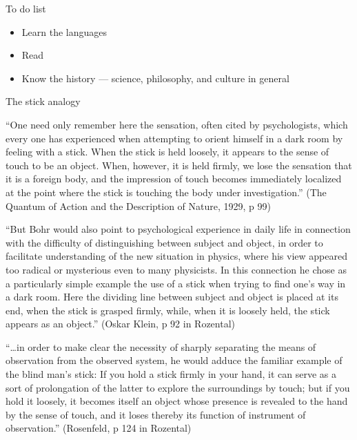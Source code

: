 \documentclass[ignorenonframetext, ]{beamer}
\begin{document}
\begin{frame}{To do list}

  \begin{itemize}
  \item Learn the languages
  \item Read 
  \item Know the history --- science, philosophy, and culture in
    general
  \end{itemize}

\end{frame}  
  


\begin{frame}{The stick analogy}

  ``One need only remember here the sensation, often cited by
  psychologists, which every one has experienced when attempting to
  orient himself in a dark room by feeling with a stick. When the
  stick is held loosely, it appears to the sense of touch to be an
  object. When, however, it is held firmly, we lose the sensation that
  it is a foreign body, and the impression of touch becomes
  immediately localized at the point where the stick is touching the
  body under investigation.'' (The Quantum of Action and the
  Description of Nature, 1929, p 99)

\end{frame}

\begin{frame}

  ``But Bohr would also point to psychological experience in daily
  life in connection with the difficulty of distinguishing between
  subject and object, in order to facilitate understanding of the new
  situation in physics, where his view appeared too radical or
  mysterious even to many physicists. In this connection he chose as a
  particularly simple example the use of a stick when trying to find
  one's way in a dark room. Here the dividing line between subject and
  object is placed at its end, when the stick is grasped firmly,
  while, when it is loosely held, the stick appears as an object.''
  (Oskar Klein, p 92 in Rozental)

\end{frame}

\begin{frame}

  ``\dots in order to make clear the necessity of sharply separating
  the means of observation from the observed system, he would adduce
  the familiar example of the blind man's stick: If you hold a stick
  firmly in your hand, it can serve as a sort of prolongation of the
  latter to explore the surroundings by touch; but if you hold it
  loosely, it becomes itself an object whose presence is revealed to
  the hand by the sense of touch, and it loses thereby its function of
  instrument of observation.'' (Rosenfeld, p 124 in Rozental)

\end{frame}
\end{document}
